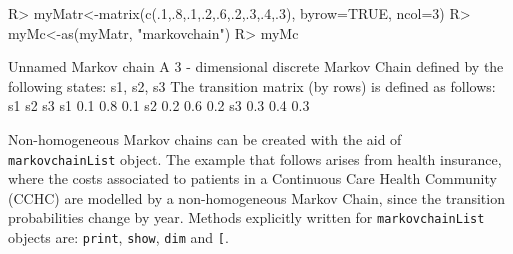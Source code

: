 \documentclass[
  nojss]{jss}
\begin{document}
\begin{CodeChunk}

\begin{CodeInput}
R> myMatr<-matrix(c(.1,.8,.1,.2,.6,.2,.3,.4,.3), byrow=TRUE, ncol=3)
R> myMc<-as(myMatr, "markovchain")
R> myMc
\end{CodeInput}

\begin{CodeOutput}
Unnamed Markov chain 
 A  3 - dimensional discrete Markov Chain defined by the following states: 
 s1, s2, s3 
 The transition matrix  (by rows)  is defined as follows: 
    s1  s2  s3
s1 0.1 0.8 0.1
s2 0.2 0.6 0.2
s3 0.3 0.4 0.3
\end{CodeOutput}
\end{CodeChunk}

Non-homogeneous Markov chains can be created with the aid of \texttt{markovchainList} object. The example that follows arises from health insurance, where the costs associated to patients in a Continuous Care Health Community (CCHC) are modelled by a non-homogeneous Markov Chain, since the transition probabilities change by year. Methods explicitly written for \texttt{markovchainList} objects are: \texttt{print}, \texttt{show}, \texttt{dim} and \texttt{{[}}.
\end{document}
